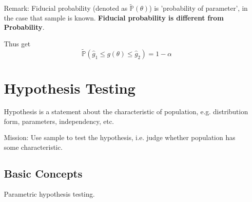     Remark: Fiducial probability (denoted as $\tilde{\mathbb{P}}(\theta)$) is 'probability of parameter', in the case that sample is known. \textbf{Fiducial probability is different from Probability}.

    Thus get
    \begin{equation}
        \tilde{\mathbb{P}}(\hat{g}_1\leq g(\theta)\leq \hat{g}_2)=1-\alpha
    \end{equation}







\section{Hypothesis Testing}\label{SectionHypothesisTesting}
    Hypothesis is a statement about the characteristic of population, e.g. distribution form, parameters, independency, etc. 
    
    Mission: Use sample to test the hypothesis, i.e. judge whether population has some characteristic.

\subsection{Basic Concepts}\label{SubSectionHypothesisTestingBasicConcepts}
    Parametric hypothesis testing.

